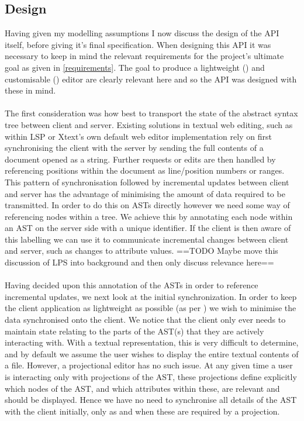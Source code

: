 \documentclass{report}
\begin{document}
\subsection{Design}\label{api}
Having given my modelling assumptions I now discuss the design of the API itself, before giving it's final specification. When designing this API it was necessary to keep in mind the relevant requirements for the project's ultimate goal as given in \ref{requirements}. The goal to produce a lightweight (\RLightweight) and customisable (\RCustom) editor are clearly relevant here and so the API was designed with these in mind.
\\
\\
The first consideration was how best to transport the state of the abstract syntax tree between client and server. Existing solutions in textual web editing, such as within LSP or Xtext's own default web editor implementation rely on first synchronising the client with the server by sending the full contents of a document opened as a string. Further requests or edits are then handled by referencing positions within the document as line/position numbers or ranges. This pattern of synchronisation followed by incremental updates between client and server has the advantage of minimising the amount of data required to be transmitted. In order to do this on ASTs directly however we need some way of referencing nodes within a tree. We achieve this by annotating each node within an AST on the server side with a unique identifier. If the client is then aware of this labelling we can use it to communicate incremental changes between client and server, such as changes to attribute values.
==TODO Maybe move this discussion of LPS into background and then only discuss relevance here==
\\
\\
Having decided upon this annotation of the ASTs in order to reference incremental updates, we next look at the initial synchronization. In order to keep the client application as lightweight as possible (as per \RLightweight) we wish to minimise the data synchronised onto the client. We notice that the client only ever needs to maintain state relating to the parts of the AST(s) that they are actively interacting with. With a textual representation, this is very difficult to determine, and by default we assume the user wishes to display the entire textual contents of a file. However, a projectional editor has no such issue. At any given time a user is interacting only with projections of the AST, these projections define explicitly which nodes of the AST, and which attributes within these, are relevant and should be displayed. Hence we have no need to synchronise all details of the AST with the client initially, only as and when these are required by a projection.
\end{document}
